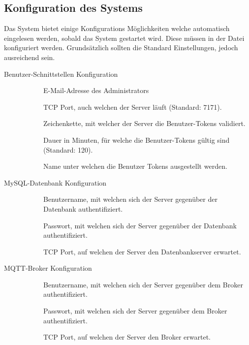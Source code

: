 \subsection{Konfiguration des Systems}
Das System bietet einige Konfigurations Möglichkeiten welche automatisch eingelesen werden, sobald das System gestartet wird. Diese müssen in der  Datei konfiguriert werden. Grundsätzlich sollten die Standard Einstellungen, jedoch ausreichend sein.
\begin{description}
\item[Benutzer-Schnittstellen Konfiguration]\hfill\begin{description}
\item[] E-Mail-Adresse des Administrators
\item[] TCP Port, auch welchen der Server läuft (Standard: 7171).
\item[] Zeichenkette, mit welcher der Server die Benutzer-Tokens validiert. 
\item[] Dauer in Minuten, für welche die Benutzer-Tokens gültig sind (Standard: 120).
\item[] Name unter welchen die Benutzer Tokens ausgestellt werden. 
\end{description}
\item[MySQL-Datenbank Konfiguration]\hfill\begin{description}
\item[] Benutzername, mit welchen sich der Server gegenüber der Datenbank authentifiziert.
\item[] Passwort, mit welchen sich der Server gegenüber der Datenbank authentifiziert.
\item[] TCP Port, auf welchen der Server den Datenbankserver erwartet.
\end{description} 
\item[MQTT-Broker Konfiguration]\hfill\begin{description}
\item[] Benutzername, mit welchen sich der Server gegenüber dem Broker authentifiziert.
\item[] Passwort, mit welchen sich der Server gegenüber dem Broker authentifiziert.
\item[] TCP Port, auf welchen der Server den Broker erwartet.
\end{description} 
\end{description}

